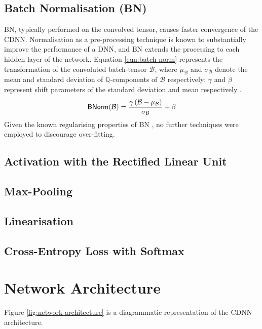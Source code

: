 \documentclass[journal]{IEEEtran}
\DeclareMathOperator\batchnorm{\mathsf{BNorm}}
\begin{document}
\subsection{Batch Normalisation (BN)}
BN, typically performed on the convolved tensor, causes faster convergence of
the CDNN\footnotemark. Normalisation as a pre-processing technique is known to
substantially improve the performance of a DNN, and BN extends the processing to
each hidden layer of the network. Equation \eqref{eqn:batch-norm} represents the
transformation of the convoluted batch-tensor $\mathcal{B}$, where
$\mu_\mathcal{B}$ and $\sigma_\mathcal{B}$ denote the mean and standard
deviation of $\mathbb{Q}$-components of $\mathcal{B}$ respectively; $\gamma$ and
$\beta$ represent shift parameters of the standard deviation and mean
respectively \cite{Laarhoven:2017}.
\begin{equation}
    \batchnorm(\mathcal{B}) = \frac{%
        \gamma\left(\mathcal{B}-\mu_\mathcal{B}\right)}
    {\sigma_\mathcal{B}} + \beta \label{eqn:batch-norm}
\end{equation}
Given the known regularising properties of BN \cite{Luo:2019}, no further
techniques were employed to discourage over-fitting.

\subsection{Activation with the Rectified Linear Unit}
\subsection{Max-Pooling}
\subsection{Linearisation}
\subsection{Cross-Entropy Loss with Softmax}

\section{Network Architecture}
Figure \ref{fig:network-architecture} is a diagrammatic representation of the
CDNN architecture.
\begin{figure*}[t]
    \caption{The network architecture of the CDNN, where $\mathsf{Func}~(N / M)$
    denotes a transformation from $N$ features to $M$ features, and $\left(I_1
    \times I_2 \times \ldots \times I_K\right)$ notates a $K$-way tensor of the
    specified dimensions.}%
    \label{fig:network-architecture}
\end{figure*}
\end{document}
